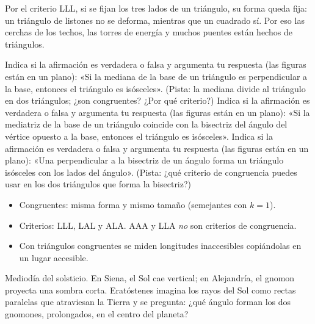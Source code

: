 \documentclass[11pt]{article}
\begin{document}
\begin{aplicacion}
Por el criterio LLL, si se fijan los tres lados de un triángulo, su forma queda
fija: un triángulo de listones no se deforma, mientras que un cuadrado sí. Por eso
las cerchas de los techos, las torres de energía y muchos puentes están hechos de
triángulos.
\end{aplicacion}

\begin{preguntas}
\pregunta Indica si la afirmación es verdadera o falsa y argumenta tu respuesta (las
figuras están en un plano): «Si la mediana de la base de un triángulo es
perpendicular a la base, entonces el triángulo es isósceles». (Pista: la mediana
divide al triángulo en dos triángulos; ¿son congruentes? ¿Por qué criterio?)
\pregunta Indica si la afirmación es verdadera o falsa y argumenta tu respuesta (las
figuras están en un plano): «Si la mediatriz de la base de un triángulo coincide con
la bisectriz del ángulo del vértice opuesto a la base, entonces el triángulo es
isósceles».
\pregunta Indica si la afirmación es verdadera o falsa y argumenta tu respuesta (las
figuras están en un plano): «Una perpendicular a la bisectriz de un ángulo forma un
triángulo isósceles con los lados del ángulo». (Pista: ¿qué criterio de congruencia
puedes usar en los dos triángulos que forma la bisectriz?)
\end{preguntas}

\begin{resumen}
\begin{itemize}
  \item Congruentes: misma forma y mismo tamaño (semejantes con $k = 1$).
  \item Criterios: LLL, LAL y ALA. AAA y LLA \emph{no} son criterios de congruencia.
  \item Con triángulos congruentes se miden longitudes inaccesibles copiándolas en un lugar accesible.
\end{itemize}
\end{resumen}

\label{tema:thales}

\begin{hilo}
Mediodía del solsticio. En Siena, el Sol cae vertical; en Alejandría, el gnomon
proyecta una sombra corta. Eratóstenes imagina los rayos del Sol como rectas
paralelas que atraviesan la Tierra y se pregunta: ¿qué ángulo forman los dos
gnomones, prolongados, en el centro del planeta?
\end{hilo}
\end{document}
